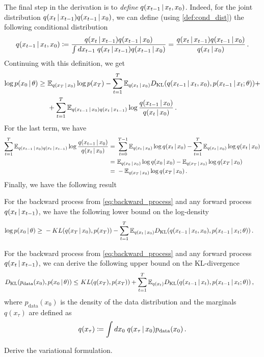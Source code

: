 The final step in the derivation is to \textit{define} $q(x_{t-1}\,|\, x_t, x_0)$. Indeed, for the joint distribution $q(x_{t}\,|\, x_{t-1})q(x_{t-1}\,|\, x_0)$, we can define (using \cref{def:cond_dist}) the following conditional distribution
\begin{align}
    q(x_{t-1}\,|\, x_{t}, x_0) \coloneqq \frac{q(x_{t}\,|\, x_{t-1})q(x_{t-1}\,|\, x_0)}{\int dx_{t-1}\;q(x_{t}\,|\, x_{t-1})q(x_{t-1}\,|\, x_0)} = \frac{q(x_{t}\,|\, x_{t-1})q(x_{t-1}\,|\, x_0)}{q(x_t\,|\, x_0)}\,.
\end{align}
Continuing with this definition, we get
\begin{align}
    \log p(x_0\,|\, \theta) \geq~& \mathbb{E}_{q(x_T\,|\, x_0)}\log p(x_T) - \sum_{t=1}^{T}\mathbb{E}_{q(x_{t}\,|\, x_0)}D_{\mathrm{KL}}(q(x_{t-1}\,|\, x_{t},x_0),p(x_{t-1}\,|\, x_t;\theta)) + \\
    ~& + \sum_{t=1}^{T}\mathbb{E}_{q(x_{t-1}\,|\, x_0)q(x_{t}\,|\, x_{t-1})}\log\frac{q(x_{t-1}\,|\, x_0)}{q(x_t\,|\, x_0)}\,.
\end{align}
For the last term, we have
\begin{align}
    \sum_{t=1}^{T}\mathbb{E}_{q(x_{t-1}\,|\, x_0)q(x_{t}\,|\, x_{t-1})}\log\frac{q(x_{t-1}\,|\, x_0)}{q(x_t\,|\, x_0)} =~& \sum_{t=0}^{T-1}\mathbb{E}_{q(x_{t}\,|\, x_0)}\log q(x_t\,|\, x_0) - \sum_{t=1}^{T}\mathbb{E}_{q(x_{t}\,|\, x_0)}\log q(x_t\,|\, x_0)\\
    =~& \mathbb{E}_{q(x_{0}\,|\, x_0)}\log q(x_0\,|\, x_0) - \mathbb{E}_{q(x_{T}\,|\, x_0)}\log q(x_T\,|\, x_0) \\
    =~& - \mathbb{E}_{q(x_{T}\,|\, x_0)}\log q(x_T\,|\, x_0)\,.
\end{align}
Finally, we have the following result
\begin{theorem}
    For the backward process from \cref{eq:backward_process} and any forward process $q(x_{t}\,|\, x_{t-1})$, we have the following lower bound on the log-density
    \begin{align}
    \log p(x_0\,|\, \theta) \geq~& - KL(q(x_T \,|\, x_0),p(x_T)) - \sum_{t=1}^{T}\mathbb{E}_{q(x_{t}\,|\, x_0)}D_{\mathrm{KL}}(q(x_{t-1}\,|\, x_{t},x_0),p(x_{t-1}\,|\, x_t;\theta))\,.
    \end{align}
\end{theorem}
\begin{proposition}
    For the backward process from \cref{eq:backward_process} and any forward process $q(x_{t}\,|\, x_{t-1})$, we can derive the following upper bound on the KL-divergence
    \begin{align}
    D_{\mathrm{KL}}(p_{\text{data}}(x_0), p(x_0\,|\, \theta)) \leq~&  KL(q(x_T),p(x_T)) + \sum_{t=1}^{T}\mathbb{E}_{q(x_{t})}D_{\mathrm{KL}}(q(x_{t-1}\,|\, x_{t}),p(x_{t-1}\,|\, x_t;\theta))\,,
    \end{align}
    where $p_{\text{data}}(x_0)$ is the density of the data distribution and the marginals $q(x_\tau)$ are defined as
    \begin{align}
        q(x_\tau)\coloneqq \int dx_0\;q(x_\tau\,|\, x_0)p_{\text{data}}(x_0)\,.
    \end{align}
\end{proposition}
\begin{exercise}
    Derive the variational formulation.
\end{exercise}


